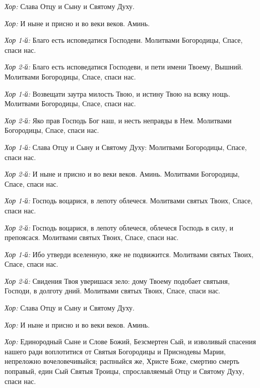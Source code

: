 \begin{mymulticols}
{\itshape Хор:} Слава Отцу и Сыну и Святому Духу. 

{\itshape Хор:} И ныне и присно и во веки веков. Аминь. 



{\itshape Хор 1-й:} Благо есть исповедатися Господеви. Молитвами Богородицы, Спасе, спаси нас. 

{\itshape Хор 2-й:} Благо есть исповедатися Господеви, и пети имени Твоему, Вышний. Молитвами Богородицы, Спасе, спаси нас. 

{\itshape Хор 1-й:} Возвещати заутра милость Твою, и истину Твою на всяку нощь. Молитвами Богородицы, Спасе, спаси нас. 

{\itshape Хор 2-й:} Яко прав Господь Бог наш, и несть неправды в Нем. Молитвами Богородицы, Спасе, спаси нас.

{\itshape Хор 1-й:} Слава Отцу и Сыну и Святому Духу: Молитвами Богородицы, Спасе, спаси нас.

{\itshape Хор 2-й:} И ныне и присно и во веки веков. Аминь. Молитвами Богородицы, Спасе, спаси нас.


{\itshape Хор 1-й:} Господь воцарися, в лепоту облечеся. Молитвами святых Твоих, Спасе, спаси нас. 

{\itshape Хор 2-й:} Господь воцарися, в лепоту облечеся, облечеся Господь в силу, и препоясася. Молитвами святых Твоих, Спасе, спаси нас.

{\itshape Хор 1-й:} Ибо утверди вселенную, яже не подвижится. Молитвами святых Твоих, Спасе, спаси нас.

{\itshape Хор 2-й:} Свидения Твоя уверишася зело: дому Твоему подобает святыня, Господи, в долготу дний. Молитвами святых Твоих, Спасе, спаси нас.

{\itshape Хор:} Слава Отцу и Сыну и Святому Духу. 

{\itshape Хор:} И ныне и присно и во веки веков. Аминь. 


{\itshape Хор:} Единородный Сыне и Слове Божий, Безсмертен Сый, и изволивый спасения нашего ради воплотитися от Святыя Богородицы и Приснодевы Марии, непреложно вочеловечивыйся; распныйся же, Христе Боже, смертию смерть поправый, един Сый Святыя Троицы, спрославляемый Отцу и Святому Духу, спаси нас. 



\end{mymulticols}
